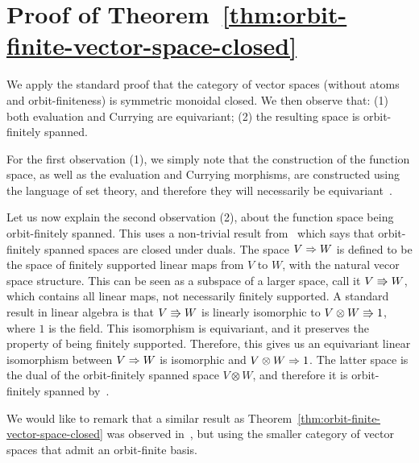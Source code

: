 \section{Proof of Theorem~\ref{thm:orbit-finite-vector-space-closed}}
 We apply the standard proof that the category of vector spaces (without atoms and orbit-finiteness) is symmetric monoidal closed. We then observe that: (1) both evaluation and Currying are equivariant; (2) the resulting space is orbit-finitely spanned. 
    
    For the first observation (1), we simply note that the construction of the function space, as well as  the evaluation and Currying morphisms, are constructed using the language of set theory, and therefore they will necessarily be equivariant~\cite[Equivariance Principle]{bojanczyk_slightly2018}.

    Let us now explain the second observation (2), about the function space being orbit-finitely spanned. This uses a non-trivial result from~\cite{bojanczykKM21OrbitFiniteVector} which says that orbit-finitely spanned spaces are closed under duals. 
    The space $V \Rightarrow W$ is defined to be the space of finitely supported linear maps from $V$ to $W$, with the natural vecor space structure. This can be seen as a subspace of a larger space, call it $V \Rrightarrow W$, which contains all linear maps, not necessarily finitely supported. A standard result in linear algebra is that $V \Rrightarrow W$ is linearly isomorphic to $ V \otimes W \Rrightarrow 1$, where $1$ is the field. This isomorphism is equivariant, and it preserves the property of being finitely supported. Therefore, this gives us an equivariant linear isomorphism between $V \Rightarrow W$ is isomorphic and $ V \otimes W \Rightarrow 1$. The latter space is the dual of the orbit-finitely spanned space $V \otimes W$, and therefore it is orbit-finitely spanned by~\cite[Corollary VI.5]{bojanczykKM21OrbitFiniteVector}.


    We would like to remark that a similar result as Theorem~\ref{thm:orbit-finite-vector-space-closed} was observed in~\cite[Theorem 3.8]{przybyłek2024note}, but using the smaller category of vector spaces that admit an orbit-finite basis. 